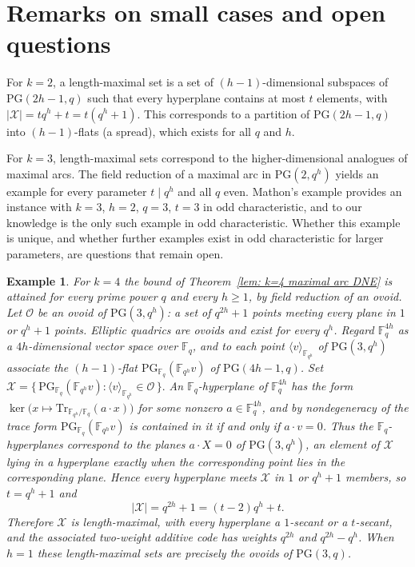\documentclass[12pt, twoside]{article}
\newtheorem{example}[theorem]{\bf Example}
\begin{document}
	\section{Remarks on small cases and open questions}\label{sec: remarks}
	
	For $k=2$, a length-maximal set is a set of $(h-1)$-dimensional subspaces of $\mathrm{PG}(2h-1,q)$ such that every hyperplane contains at most $t$ elements, with $|\mathcal{X}|=tq^h+t = t(q^h+1)$. This corresponds to a partition of $\mathrm{PG}(2h-1,q)$ into $(h-1)$-flats (a spread), which exists for all $q$ and $h$.
	
	For $k=3$, length-maximal sets correspond to the higher-dimensional analogues of maximal arcs. The field reduction of a maximal arc in $\mathrm{PG}(2,q^h)$ yields an example for every parameter $t \mid q^h$ and all $q$ even. Mathon's example \cite{DDHM2002} provides an instance with $k=3$, $h=2$, $q=3$, $t=3$ in odd characteristic, and to our knowledge is the only such example in odd characteristic. Whether this example is unique, and whether further examples exist in odd characteristic for larger parameters, are questions that remain open.

	\begin{example}\label{ex: ovoid}
		For $k=4$ the bound of Theorem~\ref{lem: k=4 maximal arc DNE} is attained for every prime power $q$ and every $h\ge1$, by field reduction of an ovoid. Let  $\mathcal{O}$ be an ovoid of $\mathrm{PG}(3,q^h)$: a set of $q^{2h}+1$ points meeting every plane in $1$ or $q^h+1$ points. Elliptic quadrics are ovoids and exist for every $q^h$. Regard $\mathbb{F}_q^{4h}$ as a $4h$-dimensional vector space over $\mathbb{F}_q$, and to each point $\langle v\rangle_{\mathbb{F}_{q^h}}$ of $\mathrm{PG}(3,q^h)$ associate the $(h-1)$-flat $\mathrm{PG}_{\mathbb{F}_q}(\mathbb{F}_{q^h} v)$ of $\mathrm{PG}(4h-1,q)$. Set $
		\mathcal{X} = \{\,\mathrm{PG}_{\mathbb{F}_q}(\mathbb{F}_{q^h} v) : \langle v\rangle_{\mathbb{F}_{q^h}}\in\mathcal{O}\,\}.
		$
		An $\mathbb{F}_q$-hyperplane of $\mathbb{F}_q^{4h}$ has the form $\ker\bigl(x\mapsto\mathrm{Tr}_{\mathbb{F}_{q^h}/\mathbb{F}_q}(a\cdot x)\bigr)$ for some nonzero $a\in\mathbb{F}_q^{4h}$, and by nondegeneracy of the trace form $\mathrm{PG}_{\mathbb{F}_q}(\mathbb{F}_{q^h} v)$ is contained in it if and only if $a\cdot v=0$. Thus the $\mathbb{F}_q$-hyperplanes correspond to the planes $a\cdot X=0$ of $\mathrm{PG}(3,q^h)$, an element of $\mathcal{X}$ lying in a hyperplane exactly when the corresponding point lies in the corresponding plane. Hence every hyperplane meets $\mathcal{X}$ in $1$ or $q^h+1$ members, so $t=q^h+1$ and
		$$
		|\mathcal{X}| = q^{2h}+1 = (t-2)q^h+t.
		$$
		Therefore $\mathcal{X}$ is length-maximal, with every hyperplane a $1$-secant or a $t$-secant, and the associated two-weight additive code has weights $q^{2h}$ and $q^{2h}-q^h$. When $h=1$ these length-maximal sets are precisely the ovoids of $\mathrm{PG}(3,q)$.
	\end{example}
	
\end{document}
